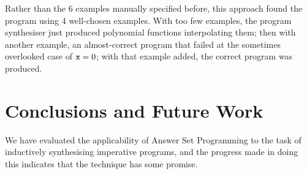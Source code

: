 \documentclass[a4paper,twoside,notitlepage]{report}
\begin{document}
Rather than the 6 examples manually specified before, this approach found 
the program using 4 well-chosen examples. With too few examples, the 
program synthesiser just produced polynomial functions interpolating them; 
then with another example, an almost-correct program that failed at the 
sometimes overlooked case of $\verb|x|=0$; with that example added, the 
correct program was produced.

\begin{comment}
\chapter{Evaluation}
\section{Power and Accuracy}
\subsection{Extent of Capabilities}
\subsection{Correctness of Generated Programs}
\section{Efficiency}
\subsection{Time and Space Usage}
\subsection{Number of Examples Needed}
\subsection{Quality of Generated Programs}
\section{Comparison with Existing Systems}
\end{comment}

\chapter{Conclusions and Future Work}

We have evaluated the applicability of Answer Set Programming to the task of 
inductively synthesising imperative programs, and the progress made in doing this 
indicates that the technique has some promise.
\end{document}
